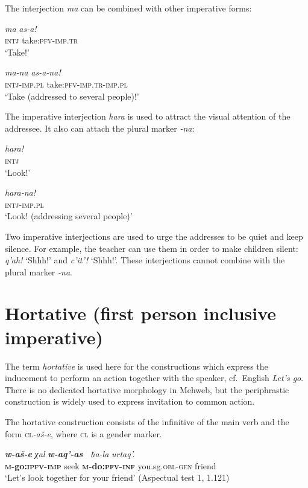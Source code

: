 ﻿\documentclass[output=paper]{langsci/langscibook}
\begin{document}
The interjection \emph{ma} can be combined with other imperative forms:

\ea %
\gll \emph{ma} \emph{as-a!}\\
\textsc{intj} take:\textsc{pfv}-\textsc{imp}.\textsc{tr}\\
\glt `Take!'

\ex %
\gll \emph{ma-na} \emph{as-a-na!}\\
\textsc{intj}-\textsc{imp}.\textsc{pl} take:\textsc{pfv}-\textsc{imp}.\textsc{tr}-\textsc{imp}.\textsc{pl}\\
\glt `Take (addressed to several people)!'
\z

The imperative interjection \emph{hara} is used to attract the visual
attention of the addressee. It also can attach the plural marker
\emph{-na}:

\ea %
\gll \emph{hara!}\\
\textsc{intj}\\
\glt `Look!'

\ex %
\gll \emph{hara-na!}\\
\textsc{intj}-\textsc{imp}.\textsc{pl}\\
\glt `Look! (addressing several people)'
\z

Two imperative interjections are used to urge the addresses to be quiet
and keep silence. For example, the teacher can use them in order to make
children silent: \emph{q'ah!} `Shhh!' and \emph{c'it'!} `Shhh!'. These
interjections cannot combine with the plural marker \emph{-na}.

\section{Hortative (first person inclusive imperative)}\label{hortative}


The term \emph{hortative} is used here for the constructions which
express the inducement to perform an action together with the speaker,
cf.\ English \emph{Let's go}. There is no dedicated hortative morphology
in Mehweb, but the periphrastic construction is widely used to express
invitation to common action.

The hortative construction consists of the infinitive of the main verb and
the form \textsc{cl}\emph{-aš-e}, where \textsc{cl} is a gender marker.

\ea %
\gll\emph{\textbf{w-aš-e}} \emph{χal} \emph{\textbf{w-aq'-as~}}  \emph{ħa-la} \emph{urtaq'.}\\
\textbf{\textsc{m}-go:\textsc{ipfv}-\textsc{imp}} seek \textbf{\textsc{m}-do:\textsc{pfv}-\textsc{inf}} you.sg.\textsc{obl}-\textsc{gen}  friend\\
\glt `Let's look together for your friend' (Aspectual test 1, 1.121)
\z
\end{document}
